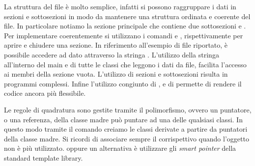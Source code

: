 

La struttura del file \`e molto semplice, infatti si possono raggruppare
i dati in sezioni e sottosezioni in modo da mantenere una struttura ordinata
e coerente del file. In particolare notiamo la sezione principale
 che contiene due sottosezioni  e .
Per implementare coerentemente si utilizzano i comandi \cpp{[./nomesezione]}
e \cpp{[../]}, rispettivamente per aprire e chiudere una sezione.
In riferimento all'esempio di file riportato, \`e possibile accedere ad dato
 attraverso la stringa . L'utilizzo della
stringa  all'interno del main e di tutte le classi che leggono
i dati da file, facilita l'accesso ai membri della sezione vuota.
L'utilizzo di sezioni e sottosezioni risulta in programmi complessi.
Infine l'utilizzo congiunto di ,  e di 
permette di rendere il codice ancora pi\`u flessibile.

Le regole di quadratura sono gestite tramite il polimorfismo, ovvero un
puntatore, o una referenza, della classe madre pu\`o puntare ad una delle
qualsiasi classi. In questo modo tramite il comando  creiamo le
classi derivate a partire da puntatori della classe madre. Si ricordi di
associare sempre il corrispettivo  quando l'oggetto non \`e
pi\`u utilizzato. oppure un alternativa \`e utilizzare gli \textit{smart pointer}
della standard template library.

\lstset{basicstyle=\scriptsize\sf}
    
\lstset{basicstyle=\sf}
